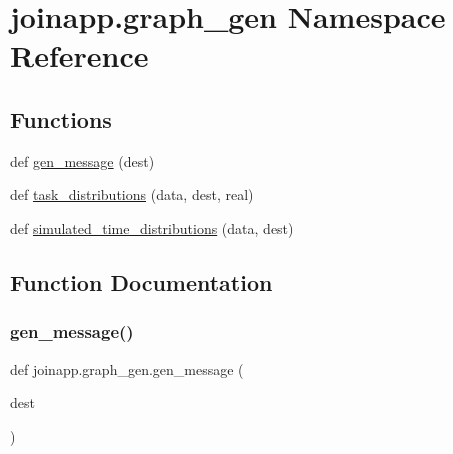 \hypertarget{namespacejoinapp_1_1graph__gen}{}\section{joinapp.\+graph\+\_\+gen Namespace Reference}
\label{namespacejoinapp_1_1graph__gen}
\subsection*{Functions}
\begin{DoxyCompactItemize}
\item 
def \mbox{\hyperlink{namespacejoinapp_1_1graph__gen_a7575e0154a728b0c5dc8d9ba508767fd}{gen\+\_\+message}} (dest)
\item 
def \mbox{\hyperlink{namespacejoinapp_1_1graph__gen_a606bd1ce0483920598fb156f840e2637}{task\+\_\+distributions}} (data, dest, real)
\item 
def \mbox{\hyperlink{namespacejoinapp_1_1graph__gen_a8f23385488b8fbd0f288087c3e20595f}{simulated\+\_\+time\+\_\+distributions}} (data, dest)
\end{DoxyCompactItemize}


\subsection{Function Documentation}
\mbox{\label{namespacejoinapp_1_1graph__gen_a7575e0154a728b0c5dc8d9ba508767fd}} 
\subsubsection{\texorpdfstring{gen\_message()}{gen\_message()}}
{\footnotesize\ttfamily def joinapp.\+graph\+\_\+gen.\+gen\+\_\+message (\begin{DoxyParamCaption}\item[{}]{dest }\end{DoxyParamCaption})}

\mbox{\label{namespacejoinapp_1_1graph__gen_a8f23385488b8fbd0f288087c3e20595f}} 
